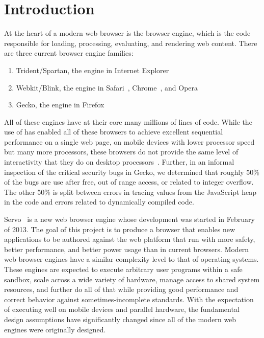 
\section{Introduction}
\label{sec:intro}
At the heart of a modern web browser is the browser engine, which is the code responsible
for loading, processing, evaluating, and rendering web content.
There are three current browser engine families:
\begin{enumerate}
\item Trident/Spartan, the engine in Internet Explorer~\cite{IE}
\item Webkit\cite{WEBKIT}/Blink, the engine in Safari~\cite{SAFARI}, Chrome~\cite{CHROME}, and Opera~\cite{OPERA}
\item Gecko, the engine in Firefox~\cite{FIREFOX}
\end{enumerate}
All of these engines have at their core many millions of lines of \Cplusplus{} code.
While the use of \Cplusplus{} has enabled all of these browsers to achieve excellent sequential
performance on a single web page, on mobile devices with lower processor speed but many
more processors, these browsers do not provide the same level of interactivity that they
do on desktop processors~\cite{parallelizing-web-pages,ZOOMM}.
Further, in an informal inspection of the critical security bugs in Gecko, we determined that
roughly 50\% of the bugs are use after free, out of range access, or related to integer
overflow.
The other 50\% is split between errors in tracing values from the JavaScript heap in the
\Cplusplus{} code and errors related to dynamically compiled code.

Servo~\cite{SERVO} is a new web browser engine whose development
was started in February of 2013.
The goal of this project is to produce a browser that enables new applications to be authored
against the web platform that run with more safety, better performance, and better power usage
than in current browsers.
Modern web browser engines have a similar complexity level to that of operating systems.
These engines are expected to execute arbitrary user programs within a safe sandbox, scale 
across a wide variety of hardware, manage access to shared system resources, and further 
do all of that while providing good performance and correct behavior
against sometimes-incomplete standards.
With the expectation of executing well on mobile devices and parallel hardware, the 
fundamental design assumptions have significantly changed since all of the modern
web engines were originally designed.



